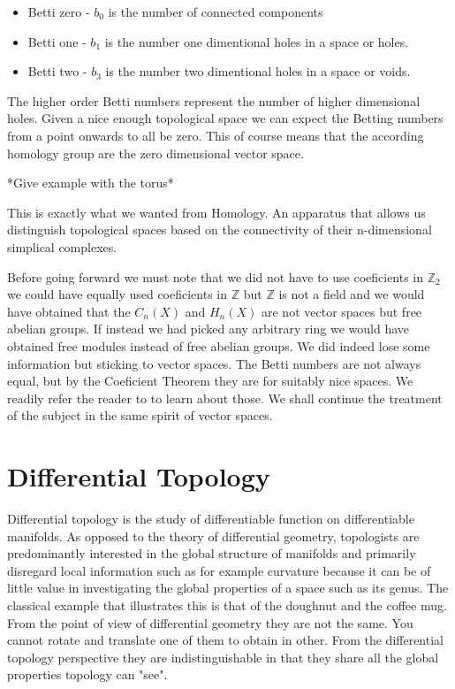 \begin{itemize}
    \item Betti zero - $b_0$ is the number of connected components
    \item Betti one - $b_1$ is the number one dimentional holes in a space or holes.
    \item Betti two - $b_3$ is the number two dimentional holes in a space or voids.
\end{itemize}


The higher order Betti numbers represent the number of higher dimensional holes. Given a nice enough topological space we can expect the Betting numbers from a point onwards to all be zero. This of course means that the according homology group are the zero dimensional vector space.

*Give example with the torus*

This is exactly what we wanted from Homology. An apparatus that allows us distinguish topological spaces based on the connectivity of their n-dimensional simplical complexes.

Before going forward we must note that we did not have to use coeficients in $\mathbb{Z}_2$ we could have equally used coeficients in $\mathbb{Z}$ but $\mathbb{Z}$ is not a field and we would have obtained that the $C_n(X)$ and $H_n(X)$ are not vector spaces but free abelian groups. If instead we had picked any arbitrary ring we would have obtained free modules instead of free abelian groups. We did indeed lose some information but sticking to vector spaces. The Betti numbers are not always equal, but by the Coeficient Theorem they are for suitably nice spaces. We readily refer the reader to \cite{algebraic-topology} to learn about those. We shall continue the treatment of the subject in the same spirit of vector spaces.

\section{Differential Topology}

Differential topology is the study of differentiable function on differentiable manifolds. As opposed to the theory of differential geometry, topologists are predominantly interested in the global structure of manifolds and primarily disregard local information such as for example curvature because it can be of little value in investigating the global properties of a space such as its genus. The classical example that illustrates this is that of the doughnut and the coffee mug. From the point of view of differential geometry they are not the same. You cannot rotate and translate one of them to obtain in other. From the differential topology perspective they are indistinguishable in that they share all the global properties topology can "see".   

